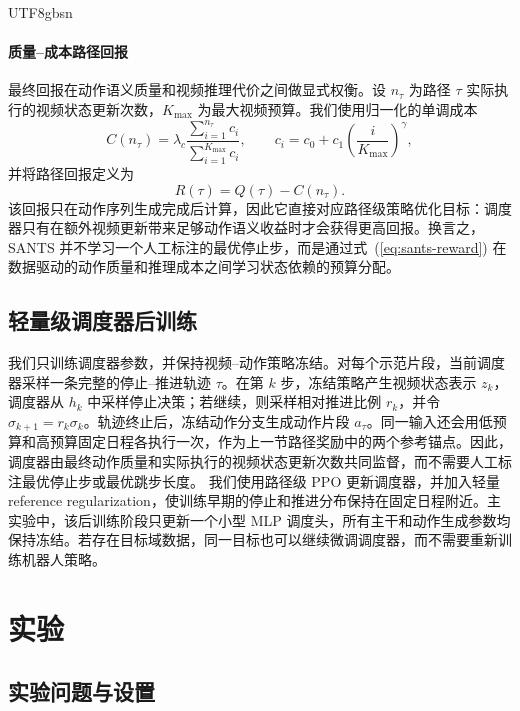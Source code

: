 \documentclass{article}
\begin{document}
\begin{CJK*}{UTF8}{gbsn}
\paragraph{质量--成本路径回报}
最终回报在动作语义质量和视频推理代价之间做显式权衡。设 \(n_{\tau}\) 为路径 \(\tau\) 实际执行的视频状态更新次数，\(K_{\max}\) 为最大视频预算。我们使用归一化的单调成本
\begin{equation}
C(n_{\tau}) =
\lambda_c
\frac{\sum_{i=1}^{n_{\tau}} c_i}{\sum_{i=1}^{K_{\max}} c_i},
\qquad
c_i=c_0+c_1\left(\frac{i}{K_{\max}}\right)^{\gamma},
\label{eq:sants-cost}
\end{equation}
并将路径回报定义为
\begin{equation}
R(\tau)=Q(\tau)-C(n_{\tau}).
\label{eq:sants-reward}
\end{equation}
该回报只在动作序列生成完成后计算，因此它直接对应路径级策略优化目标：调度器只有在额外视频更新带来足够动作语义收益时才会获得更高回报。换言之，SANTS 并不学习一个人工标注的最优停止步，而是通过式~(\ref{eq:sants-reward}) 在数据驱动的动作质量和推理成本之间学习状态依赖的预算分配。

\subsection{轻量级调度器后训练}
\label{sec:method-training}

我们只训练调度器参数，并保持视频--动作策略冻结。对每个示范片段，当前调度器采样一条完整的停止--推进轨迹 \(\tau\)。在第 \(k\) 步，冻结策略产生视频状态表示 \(z_k\)，调度器从 \(h_k\) 中采样停止决策；若继续，则采样相对推进比例 \(r_k\)，并令 \(\sigma_{k+1}=r_k\sigma_k\)。轨迹终止后，冻结动作分支生成动作片段 \(\hat{a}_{\tau}\)。同一输入还会用低预算和高预算固定日程各执行一次，作为上一节路径奖励中的两个参考锚点。因此，调度器由最终动作质量和实际执行的视频状态更新次数共同监督，而不需要人工标注最优停止步或最优跳步长度。
我们使用路径级 PPO 更新调度器，并加入轻量 reference regularization，使训练早期的停止和推进分布保持在固定日程附近。主实验中，该后训练阶段只更新一个小型 MLP 调度头，所有主干和动作生成参数均保持冻结。若存在目标域数据，同一目标也可以继续微调调度器，而不需要重新训练机器人策略。

\section{实验}

\subsection{实验问题与设置}
\label{sec:exp-setup}


\end{CJK*}
\end{document}
